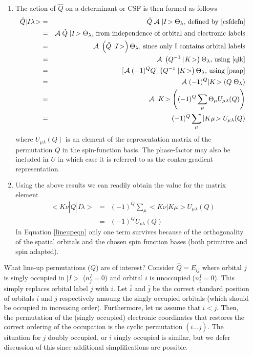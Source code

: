 \documentclass[fullpage,12pt,fleqn]{article}
\begin{document}
\begin{enumerate}
\item The action of $\hat{Q}$ on a determinant or CSF is then formed
as follows
\begin{eqnarray}
  \hat{Q} |I \lambda\! > 
  & = & \hat{Q} \; {\cal A} \; |I\! > \Theta_{\lambda} \mbox{, defined
by \ref{csfdefn}} \\
  & = & {\cal A} \; \hat{Q} \; |I\! > \Theta_{\lambda} \mbox{, from
independence of orbital and electronic labels} \\
  & = & {\cal A} \; \left( \hat{Q} \; |I\! > \right) \Theta_{\lambda}
\mbox{, since only I contains orbital labels} \\
  & = & {\cal A} \; \left( Q^{-1} \; |K\! > \right) \Theta_{\lambda} 
\mbox{, using \ref{qik}} \\
  & = & \left[ {\cal A} \; (-1)^Q Q \right]  \left( Q^{-1} \; |K\! >
\right) \Theta_{\lambda} \mbox{, using \ref{paap}} \\
  & = & {\cal A} \; (- 1)^Q |K\! > \left( Q \; \Theta_{\lambda} \right) 
 \\
  & = & {\cal A} \; |K\! > \left(  (- 1)^Q  \sum_{\mu} \Theta_{\mu}
U_{\mu \lambda}(Q) \right)  \\
  & = & (-1)^Q \sum_{\mu} |K \mu\! > U_{\mu \lambda}(Q)
\end{eqnarray}
where $U_{\mu \lambda}(Q)$ is an element of the representation matrix
of the permutation $Q$ in the spin-function basis.  The phase-factor
may also be included in $U$ in which case it is referred to as the
contra-gradient representation.

\item Using the above results we can readily obtain the value for the
matrix element
\begin{eqnarray}
 <\! K\nu | \hat{Q} | I \lambda\! > & = & (-1)^Q \sum_{\mu}
  <\! K \nu | K \mu \! > U_{\mu \lambda}(Q) \label{lineupeqn} \\
  & = & (-1)^Q U_{\nu \lambda}(Q) 
\end{eqnarray}
In Equation \ref{lineupeqn} only one term survives because of the
orthogonality of the spatial orbitals and the chosen spin function
bases (both primitive and spin adapted).
\end{enumerate}

What line-up permutations ($Q$) are of interest?  Consider $\hat{Q} =
E_{ij}$ where orbital $j$ is singly occupied in $|I\! >$ ($n_j^I = 0$)
and orbital $i$ is unoccupied ($n_i^I=0$).  This simply replaces
orbital label $j$ with $i$.  Let $\overline{i}$ and $\overline{j}$ be
the correct standard position of orbitals $i$ and $j$ respectively
amoung the singly occupied orbitals (which should be occupied in
increasing order).  Furthermore, let us assume that $i < j$.  Then,
the permutation of the (singly occupied) electronic coordinates that
restores the correct ordering of the occupation is the cyclic
permutation $(\overline{i} \ldots \overline{j})$.  The situation for
$j$ doubly occupied, or $i$ singly occupied is similar, but we defer
discussion of this since additional simplifications are possible.
\end{document}
